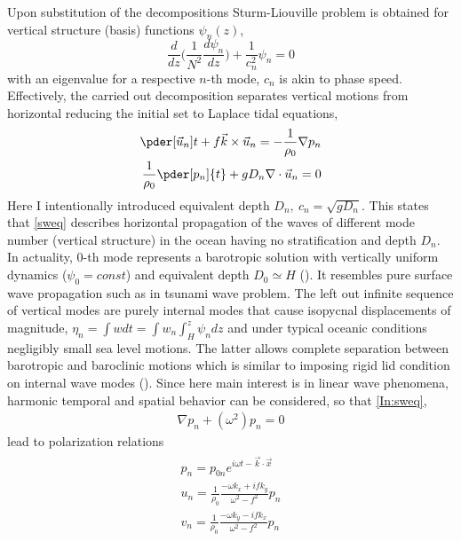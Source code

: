 Upon substitution of the decompositions Sturm-Liouville problem is obtained for vertical structure (basis) functions $\psi_n(z)$,
\begin{equation}
\frac{d}{dz}\big( \frac{1}{N^2} \frac{d \psi_n}{dz} \big) + \frac{1}{c^2_n}\psi_n = 0
\end{equation}
with an eigenvalue for a respective $n$-th mode, $c_n$ is akin to phase speed. Effectively, the carried out decomposition separates vertical motions from horizontal reducing the initial set to Laplace tidal equations,
\begin{align}
\label{In:sweq}
\begin{split}
\pder[\vec{u}_n]{t} + f \vec{k} \times \vec{u}_n = -\frac{1}{\rho_0} \nabla p_n\\
\frac{1}{\rho_0} \pder[p_n]{t} + g D_n \nabla  \cdot \vec{u}_n = 0
\end{split}
\end{align}
Here I intentionally introduced equivalent depth $D_n,~c_n = \sqrt{g D_n}$. This states that  \eqref{sweq} describes horizontal propagation of the waves of different mode number (vertical structure) in the ocean having no stratification and depth $D_n$. In actuality, $0$-th mode represents a barotropic solution with vertically uniform dynamics ($\psi_0 = const$) and equivalent depth $D_0 \simeq H$ (\cite{hendershott1981long}). It resembles pure surface wave propagation such as in tsunami wave problem. The left out infinite sequence of vertical modes are purely internal modes that cause isopycnal displacements of magnitude, $\eta_n = \int w dt = \int w_n \int_H^z \psi_n dz$ and under typical oceanic conditions negligibly small sea level motions. The latter allows complete separation between barotropic and baroclinic motions which is similar to imposing rigid lid condition on internal wave modes (\cite{kundu2008fluid}). Since here main interest is in linear wave phenomena, harmonic temporal and spatial behavior can be considered, so that \eqref{In:sweq},
\begin{align}
\label{In:helmeq}
\nabla p_n + (\omega^2) p_n = 0
\end{align}
 lead to polarization relations
\begin{align}
\label{In:svw}
\begin{split}
p_n = p_{0n} e^{i \omega t - \vec{k} \cdot \vec{x}}\\
u_n = \frac{1}{\rho_0} \frac{-\omega k_x + i f k_y}{\omega^2 - f^2} p_n\\
v_n = \frac{1}{\rho_0} \frac{-\omega k_y - i f k_x}{\omega^2 - f^2} p_n
\end{split}
\end{align}
